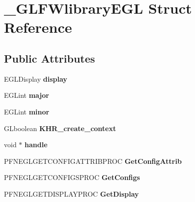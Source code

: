 \hypertarget{struct__GLFWlibraryEGL}{}\section{\+\_\+\+G\+L\+F\+Wlibrary\+E\+G\+L Struct Reference}
\label{struct__GLFWlibraryEGL}
\subsection*{Public Attributes}
\begin{DoxyCompactItemize}
\item 
\hypertarget{struct__GLFWlibraryEGL_a15523bfa0c42cff4b2df29634982768d}{}E\+G\+L\+Display {\bfseries display}\label{struct__GLFWlibraryEGL_a15523bfa0c42cff4b2df29634982768d}

\item 
\hypertarget{struct__GLFWlibraryEGL_a0ac22db40188ca63d1cf5bf5a7ccc237}{}E\+G\+Lint {\bfseries major}\label{struct__GLFWlibraryEGL_a0ac22db40188ca63d1cf5bf5a7ccc237}

\item 
\hypertarget{struct__GLFWlibraryEGL_a5cec944350277113e43807e6ff558d3a}{}E\+G\+Lint {\bfseries minor}\label{struct__GLFWlibraryEGL_a5cec944350277113e43807e6ff558d3a}

\item 
\hypertarget{struct__GLFWlibraryEGL_ad59e88f25bd0e067ec791ec640b0aa00}{}G\+Lboolean {\bfseries K\+H\+R\+\_\+create\+\_\+context}\label{struct__GLFWlibraryEGL_ad59e88f25bd0e067ec791ec640b0aa00}

\item 
\hypertarget{struct__GLFWlibraryEGL_ab639d01213759295622d666468d2c11b}{}void $\ast$ {\bfseries handle}\label{struct__GLFWlibraryEGL_ab639d01213759295622d666468d2c11b}

\item 
\hypertarget{struct__GLFWlibraryEGL_a6c2c33b9355944eb81ccf55980f204e4}{}P\+F\+N\+E\+G\+L\+G\+E\+T\+C\+O\+N\+F\+I\+G\+A\+T\+T\+R\+I\+B\+P\+R\+O\+C {\bfseries Get\+Config\+Attrib}\label{struct__GLFWlibraryEGL_a6c2c33b9355944eb81ccf55980f204e4}

\item 
\hypertarget{struct__GLFWlibraryEGL_ad93bb8c8af7bb9bd3602b1d7457f3367}{}P\+F\+N\+E\+G\+L\+G\+E\+T\+C\+O\+N\+F\+I\+G\+S\+P\+R\+O\+C {\bfseries Get\+Configs}\label{struct__GLFWlibraryEGL_ad93bb8c8af7bb9bd3602b1d7457f3367}

\item 
\hypertarget{struct__GLFWlibraryEGL_acace8d17705365254a4fb12532bcb2a7}{}P\+F\+N\+E\+G\+L\+G\+E\+T\+D\+I\+S\+P\+L\+A\+Y\+P\+R\+O\+C {\bfseries Get\+Display}\label{struct__GLFWlibraryEGL_acace8d17705365254a4fb12532bcb2a7}


\end{DoxyCompactItemize}
